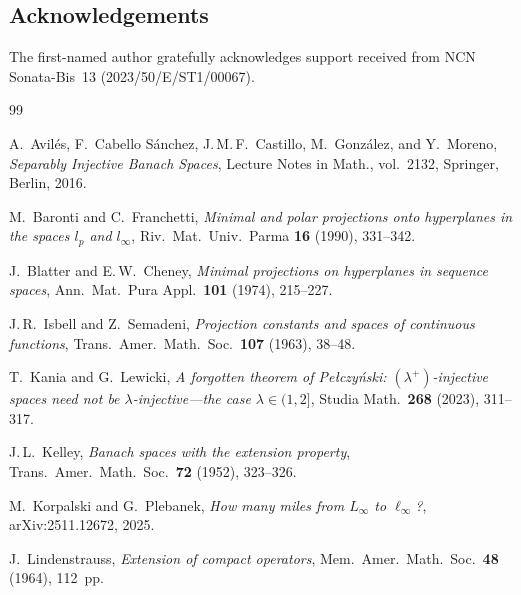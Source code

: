 \documentclass[11pt]{amsart}
\theoremstyle{definition}
\theoremstyle{remark}
\theoremstyle{plain}
\numberwithin{equation}{section}
\begin{document}
\subsection*{Acknowledgements}
The first-named author gratefully acknowledges support received from
NCN Sonata-Bis~13 (2023/50/E/ST1/00067).


\begin{thebibliography}{99}

A.~Avil\'es, F.~Cabello S\'anchez, J.\,M.\,F.~Castillo,
M.~Gonz\'alez, and Y.~Moreno,
\newblock \emph{Separably Injective Banach Spaces},
\newblock Lecture Notes in Math., vol.~2132, Springer, Berlin, 2016.

M.~Baronti and C.~Franchetti,
\newblock \emph{Minimal and polar projections onto hyperplanes in the
spaces $l_p$ and $l_\infty$},
\newblock Riv.\ Mat.\ Univ.\ Parma \textbf{16} (1990), 331--342.

J.~Blatter and E.\,W.~Cheney,
\newblock \emph{Minimal projections on hyperplanes in sequence spaces},
\newblock Ann.\ Mat.\ Pura Appl.\ \textbf{101} (1974), 215--227.

J.\,R.~Isbell and Z.~Semadeni,
\newblock \emph{Projection constants and spaces of continuous
functions},
\newblock Trans.\ Amer.\ Math.\ Soc.\ \textbf{107} (1963), 38--48.

T.~Kania and G.~Lewicki,
\newblock \emph{A forgotten theorem of Pe{\l}czy{\'n}ski:
$(\lambda^+)$-injective spaces need not be $\lambda$-injective---the
case $\lambda\in(1,2]$},
\newblock Studia Math.\ \textbf{268} (2023), 311--317.

J.\,L.~Kelley,
\newblock \emph{Banach spaces with the extension property},
\newblock Trans.\ Amer.\ Math.\ Soc.\ \textbf{72} (1952), 323--326.

M.~Korpalski and G.~Plebanek,
\newblock \emph{How many miles from $L_\infty$ to $\ell_\infty$?},
\newblock arXiv:2511.12672, 2025.

J.~Lindenstrauss,
\newblock \emph{Extension of compact operators},
\newblock Mem.\ Amer.\ Math.\ Soc.\ \textbf{48} (1964), 112~pp.

\end{thebibliography}
\end{document}

